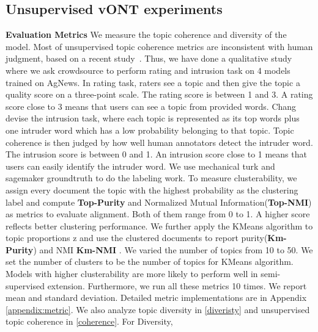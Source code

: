 \documentclass[11pt]{article}
\begin{document}
\subsection{Unsupervised vONT experiments}
\textbf{Evaluation Metrics}
We measure the topic  coherence and diversity of the model. Most of unsupervised topic coherence metrics are inconsistent with human judgment, based on a recent study~\cite{hoyle2021automated}. Thus, we have done a  qualitative study where we ask crowdsource to perform rating and intrusion task on 4 models trained on AgNews. In rating task\cite{aletras2013evaluating, newman2010automatic, mimno2011optimizing}, raters see a topic and then give the topic a quality score on a three-point scale. The rating score is between 1 and 3. A rating score close to 3 means that users can see a topic from provided words. Chang\cite{chang2009reading} devise the intrusion task, where each topic is represented as its top words plus one intruder word which has a low probability belonging to that topic. Topic coherence is then judged by how well human annotators detect the intruder word. The intrusion score is between 0 and 1. An intrusion score close to 1 means that users can easily identify the intruder word. We use mechanical turk and sagemaker groundtruth to do the labeling work.  To measure clusterability, we assign every document the topic with the highest probability as the clustering label and compute \textbf{Top-Purity} and Normalized Mutual Information(\textbf{Top-NMI}) as metrics\cite{nguyen2018improving} to evaluate alignment. Both of them range from 0 to 1. A higher score reflects better clustering performance. We further apply the KMeans algorithm to topic proportions z and use the clustered documents to report purity(\textbf{Km-Purity}) and NMI \textbf{Km-NMI} \cite{zhao2020neural}. We varied the number of topics from 10 to 50. We set the number of clusters to be the number of topics for KMeans algorithm. Models with higher clusterability are more likely to perform well in semi-supervised extension. Furthermore, we run all these metrics 10 times. We report mean and standard deviation.  Detailed metric implementations are in Appendix \ref{appendix:metric}. We also analyze topic diversity in \ref{diveristy} and unsupervised topic coherence in \ref{coherence}. For Diversity, 
\end{document}
